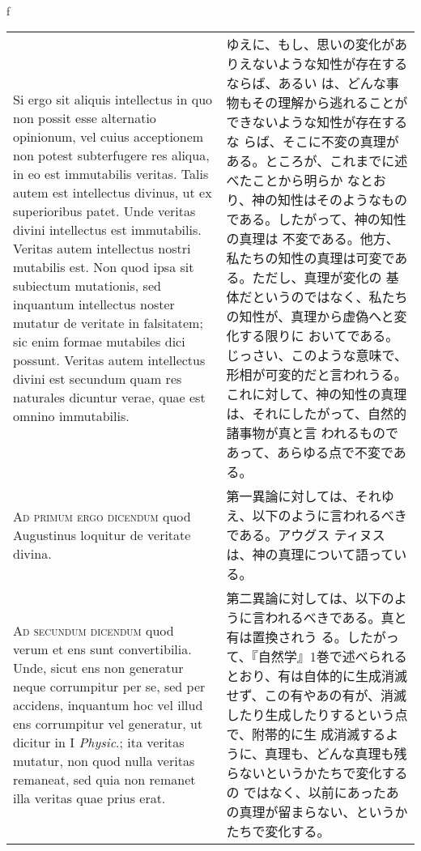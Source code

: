 \\f\documentclass[10pt]{jsarticle} %
\begin{document}
\begin{longtable}{p{21em}p{21em}}
\\

Si ergo sit aliquis intellectus in quo non possit esse alternatio
opinionum, vel cuius acceptionem non potest subterfugere res aliqua,
in eo est immutabilis veritas. Talis autem est intellectus divinus, ut
ex superioribus patet. Unde veritas divini intellectus est
immutabilis. Veritas autem intellectus nostri mutabilis est. Non quod
ipsa sit subiectum mutationis, sed inquantum intellectus noster
mutatur de veritate in falsitatem; sic enim formae mutabiles dici
possunt. Veritas autem intellectus divini est secundum quam res
naturales dicuntur verae, quae est omnino immutabilis.

&

ゆえに、もし、思いの変化がありえないような知性が存在するならば、あるい
は、どんな事物もその理解から逃れることができないような知性が存在するな
らば、そこに不変の真理がある。ところが、これまでに述べたことから明らか
なとおり、神の知性はそのようなものである。したがって、神の知性の真理は
不変である。他方、私たちの知性の真理は可変である。ただし、真理が変化の
基体だというのではなく、私たちの知性が、真理から虚偽へと変化する限りに
おいてである。じっさい、このような意味で、形相が可変的だと言われうる。
これに対して、神の知性の真理は、それにしたがって、自然的諸事物が真と言
われるものであって、あらゆる点で不変である。

\\

{\scshape Ad primum ergo dicendum} quod
Augustinus loquitur de veritate divina.

&

第一異論に対しては、それゆえ、以下のように言われるべきである。アウグス
ティヌスは、神の真理について語っている。

\\


{\scshape Ad secundum dicendum} quod verum et ens sunt
convertibilia. Unde, sicut ens non generatur neque corrumpitur per se,
sed per accidens, inquantum hoc vel illud ens corrumpitur vel
generatur, ut dicitur in I {\itshape Physic}.; ita veritas mutatur,
non quod nulla veritas remaneat, sed quia non remanet illa veritas
quae prius erat.

& 

第二異論に対しては、以下のように言われるべきである。真と有は置換されう
る。したがって、『自然学』1巻で述べられるとおり、有は自体的に生成消滅
せず、この有やあの有が、消滅したり生成したりするという点で、附帯的に生
成消滅するように、真理も、どんな真理も残らないというかたちで変化するの
ではなく、以前にあったあの真理が留まらない、というかたちで変化する。



\end{longtable}
\end{document}
